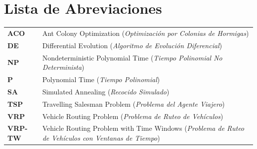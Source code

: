 \documentclass[12pt,titlepage,twoside,openright]{book}
\makeatletter
\def\cleardoublepage{\clearpage\if@twoside \ifodd\c@page\else
\hbox{}
\thispagestyle{empty}
\newpage
\if@twocolumn\hbox{}\newpage\fi\fi\fi}
\makeatother
\begin{document}

\setcounter{tocdepth}{3}
\setcounter{secnumdepth}{3}


\tableofcontents
\cleardoublepage
\listoffigures
{}
\cleardoublepage
\listoftables
{}
\cleardoublepage
\listofmyequations
{}
\cleardoublepage
\chapter*{Lista de Abreviaciones}

\vspace{0.5cm}
\begin{tabularx}{\textwidth}{>{\bfseries}l X}
	ACO    & Ant Colony Optimization (\textit{Optimización por Colonias de Hormigas})                                   \\
	DE     & Differential Evolution (\textit{Algoritmo de Evolución Diferencial})                                       \\
	NP     & Nondeterministic Polynomial Time (\textit{Tiempo Polinomial No Determinista})                              \\
	P      & Polynomial Time (\textit{Tiempo Polinomial})                                                               \\
	SA     & Simulated Annealing (\textit{Recocido Simulado})                                                           \\
	TSP    & Travelling Salesman Problem (\textit{Problema del Agente Viajero})                                         \\
	VRP    & Vehicle Routing Problem (\textit{Problema de Ruteo de Vehículos})                                          \\
	VRP-TW & Vehicle Routing Problem with Time Windows (\textit{Problema de Ruteo de Vehículos con Ventanas de Tiempo}) \\
\end{tabularx}
\vspace{0.5cm}

\mainmatter
\pagestyle{fancy}
\fancyhf{}
\fancyhead[RO,LE]{\bfseries \thepage}
\fancyhead[LO]{\nouppercase{\rightmark}}
\fancyhead[RE]{\nouppercase{\leftmark}}
\fancyfoot{}
\end{document}
